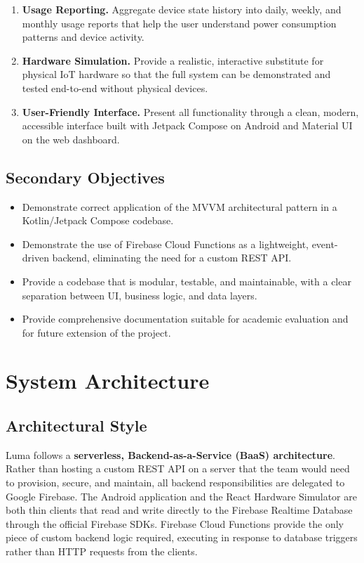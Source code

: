 \documentclass[11pt,a4paper]{article}
\begin{document}
\begin{enumerate}[label=O\arabic*.]
    \item \textbf{Usage Reporting.} Aggregate device state history into daily, weekly, and monthly usage reports that help the user understand power consumption patterns and device activity.
    \item \textbf{Hardware Simulation.} Provide a realistic, interactive substitute for physical IoT hardware so that the full system can be demonstrated and tested end-to-end without physical devices.
    \item \textbf{User-Friendly Interface.} Present all functionality through a clean, modern, accessible interface built with Jetpack Compose on Android and Material UI on the web dashboard.
\end{enumerate}

\subsection{Secondary Objectives}
\begin{itemize}
    \item Demonstrate correct application of the MVVM architectural pattern in a Kotlin/Jetpack Compose codebase.
    \item Demonstrate the use of Firebase Cloud Functions as a lightweight, event-driven backend, eliminating the need for a custom REST API.
    \item Provide a codebase that is modular, testable, and maintainable, with a clear separation between UI, business logic, and data layers.
    \item Provide comprehensive documentation suitable for academic evaluation and for future extension of the project.
\end{itemize}

\section{System Architecture}
\label{sec:architecture}

\subsection{Architectural Style}
Luma follows a \textbf{serverless, Backend-as-a-Service (BaaS) architecture}. Rather than hosting a custom REST API on a server that the team would need to provision, secure, and maintain, all backend responsibilities are delegated to Google Firebase. The Android application and the React Hardware Simulator are both thin clients that read and write directly to the Firebase Realtime Database through the official Firebase SDKs. Firebase Cloud Functions provide the only piece of custom backend logic required, executing in response to database triggers rather than HTTP requests from the clients.
\end{document}
